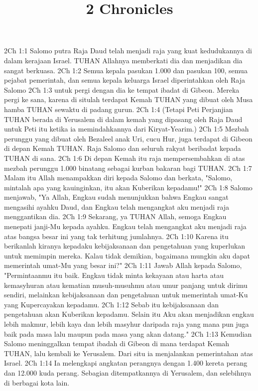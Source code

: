 

\title{2 Chronicles}

2Ch 1:1  Salomo putra Raja Daud telah menjadi raja yang kuat kedudukannya di dalam kerajaan Israel. TUHAN Allahnya memberkati dia dan menjadikan dia sangat berkuasa.
2Ch 1:2  Semua kepala pasukan 1.000 dan pasukan 100, semua pejabat pemerintah, dan semua kepala keluarga Israel diperintahkan oleh Raja Salomo
2Ch 1:3  untuk pergi dengan dia ke tempat ibadat di Gibeon. Mereka pergi ke sana, karena di situlah terdapat Kemah TUHAN yang dibuat oleh Musa hamba TUHAN sewaktu di padang gurun.
2Ch 1:4  (Tetapi Peti Perjanjian TUHAN berada di Yerusalem di dalam kemah yang dipasang oleh Raja Daud untuk Peti itu ketika ia memindahkannya dari Kiryat-Yearim.)
2Ch 1:5  Mezbah perunggu yang dibuat oleh Bezaleel anak Uri, cucu Hur, juga terdapat di Gibeon di depan Kemah TUHAN. Raja Salomo dan seluruh rakyat beribadat kepada TUHAN di sana.
2Ch 1:6  Di depan Kemah itu raja mempersembahkan di atas mezbah perunggu 1.000 binatang sebagai kurban bakaran bagi TUHAN.
2Ch 1:7  Malam itu Allah menampakkan diri kepada Salomo dan berkata, "Salomo, mintalah apa yang kauinginkan, itu akan Kuberikan kepadamu!"
2Ch 1:8  Salomo menjawab, "Ya Allah, Engkau sudah menunjukkan bahwa Engkau sangat mengasihi ayahku Daud, dan Engkau telah mengangkat aku menjadi raja menggantikan dia.
2Ch 1:9  Sekarang, ya TUHAN Allah, semoga Engkau menepati janji-Mu kepada ayahku. Engkau telah mengangkat aku menjadi raja atas bangsa besar ini yang tak terhitung jumlahnya.
2Ch 1:10  Karena itu berikanlah kiranya kepadaku kebijaksanaan dan pengetahuan yang kuperlukan untuk memimpin mereka. Kalau tidak demikian, bagaimana mungkin aku dapat memerintah umat-Mu yang besar ini?"
2Ch 1:11  Jawab Allah kepada Salomo, "Permintaanmu itu baik. Engkau tidak minta kekayaan atau harta atau kemasyhuran atau kematian musuh-musuhmu atau umur panjang untuk dirimu sendiri, melainkan kebijaksanaan dan pengetahuan untuk memerintah umat-Ku yang Kupercayakan kepadamu.
2Ch 1:12  Sebab itu kebijaksanaan dan pengetahuan akan Kuberikan kepadamu. Selain itu Aku akan menjadikan engkau lebih makmur, lebih kaya dan lebih masyhur daripada raja yang mana pun juga baik pada masa lalu maupun pada masa yang akan datang."
2Ch 1:13  Kemudian Salomo meninggalkan tempat ibadah di Gibeon di mana terdapat Kemah TUHAN, lalu kembali ke Yerusalem. Dari situ ia menjalankan pemerintahan atas Israel.
2Ch 1:14  Ia melengkapi angkatan perangnya dengan 1.400 kereta perang dan 12.000 kuda perang. Sebagian ditempatkannya di Yerusalem, dan selebihnya di berbagai kota lain.
